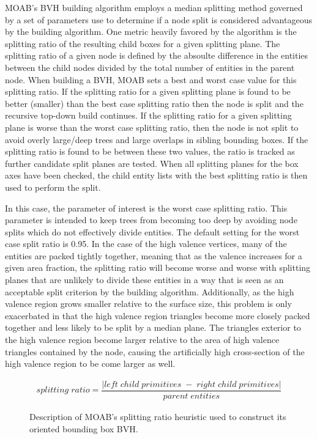 \documentclass[12pt, a4paper]{article}
\begin{document}
MOAB's BVH building algorithm employs a median splitting method governed by a set of parameters use to determine if a node split is considered advantageous by the building algorithm. One metric heavily favored by the algorithm is the splitting ratio of the resulting child boxes for a given splitting plane. The splitting ratio of a given node is defined by the absoulte difference in the entities between the child nodes divided by the total number of entities in the parent node. When building a BVH, MOAB sets a best and worst case value for this splitting ratio. If the splitting ratio for a given splitting plane is found to be better (smaller) than the best case splitting ratio then the node is split and the recursive top-down build continues. If the splitting ratio for a given splitting plane is worse than the worst case splitting ratio, then the node is not split to avoid overly large/deep trees and large overlaps in sibling bounding boxes. If the splitting ratio is found to be between these two values, the ratio is tracked as further candidate split planes are tested. When all splitting planes for the box axes have been checked, the child entity lists with the best splitting ratio is then used to perform the split.

In this case, the parameter of interest is the worst case splitting ratio. This parameter is intended to keep trees from becoming too deep by avoiding node splits which do not effectively divide entities. The default setting for the worst case split ratio is 0.95. In the case of the high valence vertices, many of the entities are packed tightly together, meaning that as the valence increases for a given area fraction, the splitting ratio will become worse and worse with splitting planes that are unlikely to divide these entities in a way that is seen as an acceptable split criterion by the building algorithm. Additionally, as the high valence region grows smaller relative to the surface size, this problem is only exacerbated in that the high valence region triangles become more closely packed together and less likely to be split by a median plane. The triangles exterior to the high valence region become larger relative to the area of high valence triangles contained by the node, causing the artificially high cross-section of the high valence region to be come larger as well.

\begin{figure}
  \begin{align*}
  splitting\;ratio  = \dfrac{|left\; child\; primitives\; -\; right\; child\; primitives|}{parent\; entities}
  \end{align*}
  \caption{Description of MOAB's splitting ratio heuristic used to construct its oriented bounding box BVH.}
  \label{split_ratio}
\end{figure}
\end{document}
